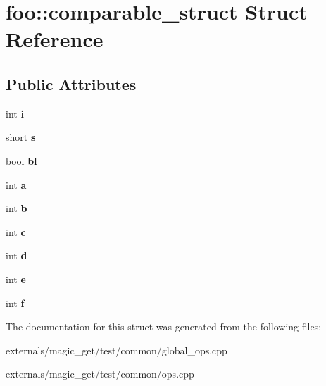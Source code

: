 \hypertarget{structfoo_1_1comparable__struct}{}\section{foo\+:\+:comparable\+\_\+struct Struct Reference}
\label{structfoo_1_1comparable__struct}
\subsection*{Public Attributes}
\begin{DoxyCompactItemize}
\item 
\mbox{\label{structfoo_1_1comparable__struct_a69ba997b141298d87e89ad76c6629d74}} 
int {\bfseries i}
\item 
\mbox{\label{structfoo_1_1comparable__struct_a8d12f4c12bdc7028b435e6671249334c}} 
short {\bfseries s}
\item 
\mbox{\label{structfoo_1_1comparable__struct_a91f0a383bdb6c0fa4de51a05813aed73}} 
bool {\bfseries bl}
\item 
\mbox{\label{structfoo_1_1comparable__struct_a4f7b102c54ae210c3985ae84836605e7}} 
int {\bfseries a}
\item 
\mbox{\label{structfoo_1_1comparable__struct_abc0ba2976f082f4bd27cfa7ad941cd49}} 
int {\bfseries b}
\item 
\mbox{\label{structfoo_1_1comparable__struct_a2e418e5581cfeff4fa15bd22475a7f4c}} 
int {\bfseries c}
\item 
\mbox{\label{structfoo_1_1comparable__struct_a1ccd2cd2c5ef2af467f5238baa2f37b8}} 
int {\bfseries d}
\item 
\mbox{\label{structfoo_1_1comparable__struct_a19bdbedfad5a36bffee2c399a37af64c}} 
int {\bfseries e}
\item 
\mbox{\label{structfoo_1_1comparable__struct_ad20eeeaef210eb0ab2bbb1fb5aa445cd}} 
int {\bfseries f}
\end{DoxyCompactItemize}


The documentation for this struct was generated from the following files\+:\begin{DoxyCompactItemize}
\item 
externals/magic\+\_\+get/test/common/global\+\_\+ops.\+cpp\item 
externals/magic\+\_\+get/test/common/ops.\+cpp\end{DoxyCompactItemize}
